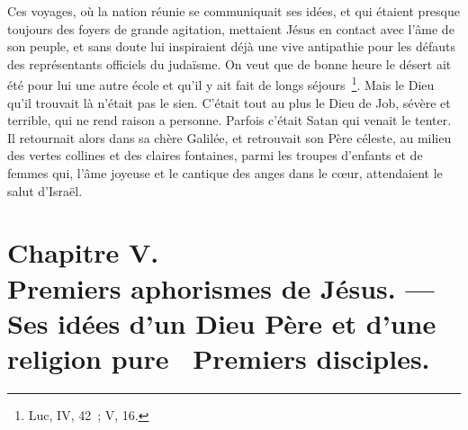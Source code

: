 \documentclass[french,twoside]{book} %
\newcommand\chapteropen{} %
\newcommand\chapterclose{} %
\begin{document}
Ces voyages, où la nation réunie se communiquait ses idées, et qui étaient presque toujours des foyers de grande agitation, mettaient Jésus en contact avec l’âme de son peuple, et sans doute lui inspiraient déjà une vive antipathie pour les défauts des représentants officiels du judaïsme. On veut que de bonne heure le désert ait été pour lui une autre école et qu’il y ait fait de longs séjours \footnote{Luc, IV, 42 ; V, 16.}. Mais le Dieu qu’il trouvait là n’était pas le sien. C’était tout au plus le Dieu de Job, sévère et terrible, qui ne rend raison a personne. Parfois c’était Satan qui venait le tenter. Il retournait alors dans sa chère Galilée, et retrouvait son Père céleste, au milieu des vertes collines et des claires fontaines, parmi les troupes d’enfants et de femmes qui, l’âme joyeuse et le cantique des anges dans le cœur, attendaient le salut d’Israël.
\chapterclose


\chapteropen
\chapter[{Chapitre V. Premiers aphorismes de Jésus. — Ses idées d’un Dieu Père et d’une religion pure  Premiers disciples.}]{Chapitre V.\\
Premiers aphorismes de Jésus. — Ses idées d’un Dieu Père et d’une religion pure  Premiers disciples.}\renewcommand{\leftmark}{Chapitre V.\\
Premiers aphorismes de Jésus. — Ses idées d’un Dieu Père et d’une religion pure  Premiers disciples.}
\end{document}
